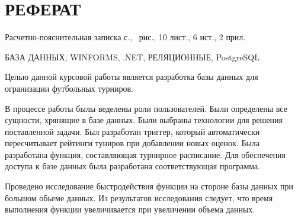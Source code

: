 \section*{\centering РЕФЕРАТ}
\setcounter{page}{2}

Расчетно-пояснительная записка \pageref{LastPage} с., \totalfigures\ рис., 10 лист., 6 ист., 2 прил.

БАЗА ДАННЫХ, WINFORMS, .NET, РЕЛЯЦИОННЫЕ, PostgreSQL

Целью данной курсовой работы является разработка базы данных для огранизации футбольных турниров.

В процессе работы былы веделены роли пользователей.
Были определены все сущности, хрянящие в базе данных.
Были выбраны технологии для решения поставленной задачи.
Был разработан триггер, который автоматически пересчитывает рейтинги туниров при добавлении новых оценок.
Была разработана функция, составляющая турнирное расписание.
Для обеспечения доступа к базе данных была разработана соответствующая программа.

Проведено исследование быстродействия функции на стороне базы данных при большом обьеме данных.  
Из результатов исследования следует, что время выполнения функции увеличивается при увеличении объема данных.